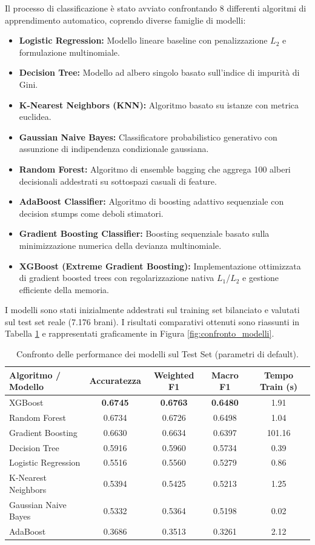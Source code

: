 \documentclass[12pt,a4paper]{article}
\begin{document}
Il processo di classificazione è stato avviato confrontando 8 differenti algoritmi di apprendimento automatico, coprendo diverse famiglie di modelli:
\begin{itemize}
    \item \textbf{Logistic Regression:} Modello lineare baseline con penalizzazione $L_2$ e formulazione multinomiale.
    \item \textbf{Decision Tree:} Modello ad albero singolo basato sull'indice di impurità di Gini.
    \item \textbf{K-Nearest Neighbors (KNN):} Algoritmo basato su istanze con metrica euclidea.
    \item \textbf{Gaussian Naive Bayes:} Classificatore probabilistico generativo con assunzione di indipendenza condizionale gaussiana.
    \item \textbf{Random Forest:} Algoritmo di ensemble bagging che aggrega 100 alberi decisionali addestrati su sottospazi casuali di feature.
    \item \textbf{AdaBoost Classifier:} Algoritmo di boosting adattivo sequenziale con decision stumps come deboli stimatori.
    \item \textbf{Gradient Boosting Classifier:} Boosting sequenziale basato sulla minimizzazione numerica della devianza multinomiale.
    \item \textbf{XGBoost (Extreme Gradient Boosting):} Implementazione ottimizzata di gradient boosted trees con regolarizzazione nativa $L_1$/$L_2$ e gestione efficiente della memoria.
\end{itemize}

I modelli sono stati inizialmente addestrati sul training set bilanciato e valutati sul test set reale (7.176 brani). I risultati comparativi ottenuti sono riassunti in Tabella \ref{tab:modelli_default} e rappresentati graficamente in Figura \ref{fig:confronto_modelli}.

\begin{table}[H]
\centering
\caption{Confronto delle performance dei modelli sul Test Set (parametri di default).}
\label{tab:modelli_default}
\begin{tabular}{lcccc}
\toprule
\textbf{Algoritmo / Modello} & \textbf{Accuratezza} & \textbf{Weighted F1} & \textbf{Macro F1} & \textbf{Tempo Train (s)} \\
\midrule
XGBoost & \textbf{0.6745} & \textbf{0.6763} & \textbf{0.6480} & 1.91 \\
Random Forest & 0.6734 & 0.6726 & 0.6498 & 1.04 \\
Gradient Boosting & 0.6630 & 0.6634 & 0.6397 & 101.16 \\
Decision Tree & 0.5916 & 0.5960 & 0.5734 & 0.39 \\
Logistic Regression & 0.5516 & 0.5560 & 0.5279 & 0.86 \\
K-Nearest Neighbors & 0.5394 & 0.5425 & 0.5213 & 1.25 \\
Gaussian Naive Bayes & 0.5332 & 0.5364 & 0.5198 & 0.02 \\
AdaBoost & 0.3686 & 0.3513 & 0.3261 & 2.12 \\
\bottomrule
\end{tabular}
\end{table}
\end{document}
